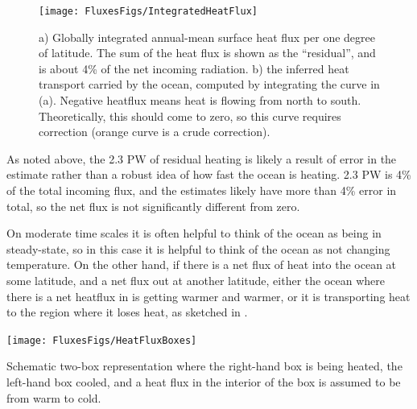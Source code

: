 \begin{figure}[htb]
\texttt{[image: FluxesFigs/IntegratedHeatFlux]}
 \caption{a) Globally integrated annual-mean surface heat flux per one degree of latitude.  The sum of the heat flux is shown as the ``residual'', and is about 4\% of the net incoming radiation. b) the inferred heat transport carried by the ocean, computed by integrating the curve in (a).  Negative heatflux means heat is flowing from north to south.  Theoretically, this should come to zero, so this curve requires correction (orange curve is a crude correction).}
  \label{fig:IntegratedHeatFlux}
\end{figure}

As noted above, the 2.3 PW of residual heating is likely a result of error in the estimate rather than a robust idea of how fast the ocean is heating.  2.3 PW is 4\% of the total incoming flux, and the estimates likely have more than 4\% error in total, so the net flux is not significantly different from zero.  

On moderate time scales it is often helpful to think of the ocean as being in steady-state, so in this case it is helpful to think of the ocean as not changing temperature.  On the other hand, if there is a net flux of heat into the ocean at some latitude, and a net flux out at another latitude, either the ocean where there is a net heatflux in is getting warmer and warmer, or it is transporting heat to the region where it loses heat, as sketched in . 


\begin{marginfigure}
\texttt{[image: FluxesFigs/HeatFluxBoxes]}
 \caption{Schematic two-box representation where the right-hand box is being heated, the left-hand box cooled, and a heat flux in the interior of the box is assumed to be from warm to cold.}
  \label{fig:HeatFluxBoxes}
\end{marginfigure}

